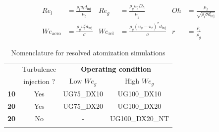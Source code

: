 \begin{equation}
\label{eq:dimensionless_numbers_jicf}
\begin{aligned}
Re_l &= \frac{\rho_l u_l d_\mathrm{inj}}{\mu_l}          &  Re_g &= \frac{\rho_g u_g D_h}{\mu_g}              &  Oh &=  \frac{\mu_l}{\sqrt{\rho_l \sigma d_\mathrm{inj}}}\\
We_\mathrm{aero} &= \frac{\rho_g u_l^2 d_\mathrm{inj}}{\sigma}    &  We_\mathrm{rel} &= \frac{\rho_g \left( u_g - u_l \right)^2 d_\mathrm{inj}}{\sigma}          & r &= \frac{\rho_l}{\rho_g} 
\end{aligned}
\end{equation}

\begin{table}[!h]
\centering
\caption{Nomenclature for resolved atomization simulations}
\begin{tabular}{cccc}
\thickhline
\multirow{2}{*}{ $\Delta x_\mathrm{min}$ [$\mu$m] } & Turbulence & \multicolumn{2}{c}{\textbf{Operating condition}} \\ 
\cline{3-4}
 & injection ? & Low $We_g$ &  High $We_g$ \\ 
\thickhline
\textbf{10} & Yes & UG75\_DX10 & UG100\_DX10 \\
\textbf{20} & Yes & UG75\_DX20 & UG100\_DX20 \\
\textbf{20} & No & - & UG100\_DX20\_NT \\
\thickhline
\end{tabular}
\label{tab:jicf_resolved_simulations_performed}
\end{table}

\clearpage


